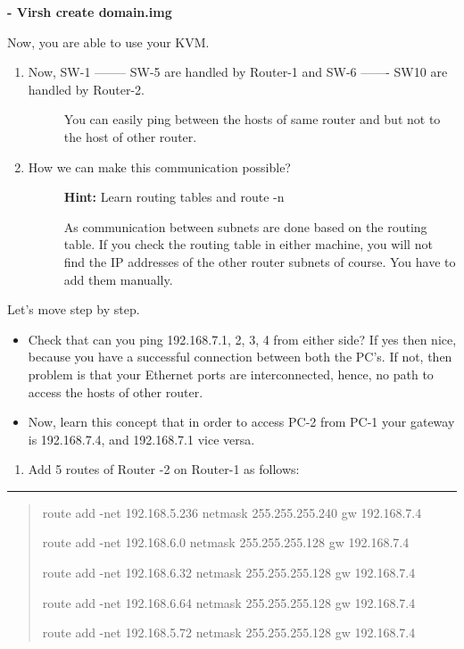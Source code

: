 \documentclass[letterpaper,10pt,english]{sphinxmanual}
\begin{document}
\textbf{- Virsh create domain.img}

Now, you are able to use your KVM.
\begin{enumerate}
\item {} \begin{description}
\item[{Now, SW-1 -------- SW-5 are handled by Router-1 and SW-6 ------- SW10 are handled by Router-2.}] \leavevmode
You can easily ping between the hosts of same router and but not to the host of other router.

\end{description}

\item {} \begin{description}
\item[{How we can make this communication possible?}] \leavevmode
\textbf{Hint:} Learn routing tables and route -n

As communication between subnets are done based on the routing table. If you check the routing table in either machine, you will not find the IP addresses of the other router subnets of course. You have to add them manually.

\end{description}

\end{enumerate}

Let's move step by step.
\begin{itemize}
\item {} 
Check that can you ping 192.168.7.1, 2, 3, 4 from either side? If yes then nice, because you have a successful connection between both the PC's. If not, then problem is that your Ethernet ports are interconnected, hence, no path to access the hosts of other router.

\item {} 
Now, learn this concept that in order to access PC-2 from PC-1 your gateway is 192.168.7.4, and 192.168.7.1 vice versa.

\end{itemize}
\begin{enumerate}
\item {} 
Add 5 routes of Router -2 on Router-1 as follows:

\end{enumerate}


\bigskip\hrule{}\bigskip

\begin{quote}

route add -net 192.168.5.236 netmask 255.255.255.240 gw 192.168.7.4

route add -net 192.168.6.0 netmask 255.255.255.128 gw 192.168.7.4

route add -net 192.168.6.32 netmask 255.255.255.128 gw 192.168.7.4

route add -net 192.168.6.64 netmask 255.255.255.128 gw 192.168.7.4

route add -net 192.168.5.72 netmask 255.255.255.128 gw 192.168.7.4
\end{quote}
\end{document}
